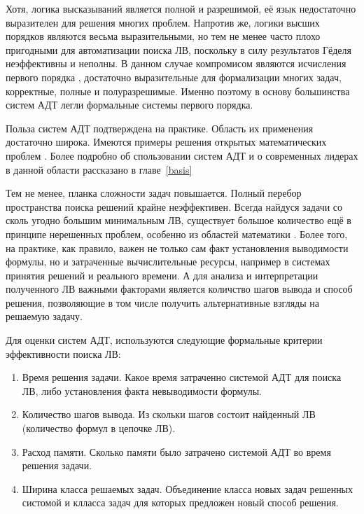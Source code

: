 Хотя, логика высказываний является полной и разрешимой, её язык недостаточно выразителен для решения многих проблем. Напротив же, логики высших порядков являются весьма выразительными, но тем не менее часто плохо пригодными для автоматизации поиска ЛВ, поскольку в силу результатов Гёделя неэффективны и неполны. В данном случае компромисом являются исчисления первого порядка \cite{Frege, Sourcebook, mendelson}, достаточно выразительные для формализации многих задач, корректные, полные и полуразрешимые. Именно поэтому в основу большинства систем АДТ легли формальные системы первого порядка.

Польза систем АДТ подтверждена на практике. Область их применения достаточно широка. Имеются примеры решения открытых математических проблем \cite{McCuneRob}. Более подробно об спользовании систем АДТ и о современных лидерах в данной области рассказано в главе~\ref{basis}

Тем не менее, планка сложности задач повышается. Полный перебор пространства поиска решений крайне неэффективен. Всегда найдуся задачи со сколь угодно большим минимальным ЛВ, существует большое количество ещё в принципе нерешенных проблем, особенно из областей математики \cite{tptp}. Более того, на практике, как правило, важен не только сам факт установления выводимости формулы, но и затраченные вычислительные ресурсы, например в системах принятия решений и реального времени. А для анализа и интерпретации полученного ЛВ важными факторами является количство шагов вывода и способ решения, позволяющие в том числе получить альтернативные взгляды на решаемую задачу.

Для оценки систем АДТ, используются следующие формальные критерии эффективности поиска ЛВ:
\begin{enumerate}
\item{Время решения задачи.} Какое время затраченно системой АДТ для поиска ЛВ, либо установления факта невыводимости формулы. 
\item{Количество шагов вывода.} Из скольки шагов состоит найденный ЛВ (количество формул в цепочке ЛВ).

\item{Расход памяти.} Сколько памяти было затрачено системой АДТ во время решения задачи.

\item{Ширина класса решаемых задач.} Объединение класса новых задач решенных систомой и клласса задач для которых предложен новый способ решения.
\end{enumerate}

